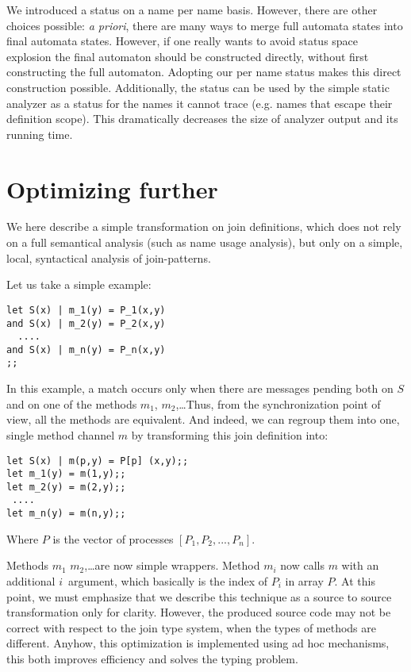 We introduced a  status on a name per name basis.  However,
there are other choices possible: {\em a priori}, there are many ways
to merge full automata states into final automata states. However, if
one really wants to avoid status space explosion the final automaton
should be constructed directly, without first constructing the full
automaton.  Adopting our per name  status makes this direct
construction possible. Additionally, the  status can be used
by the simple static analyzer as a status for the names it cannot
trace (e.g. names that escape their definition scope).  This
dramatically decreases the size of analyzer output and its running
time.

\section{Optimizing further}
\label{fusion}

We here describe a simple transformation on
join definitions, which does not rely on a full semantical analysis
(such as name usage analysis),
but only on a simple, local, syntactical analysis of join-patterns.


Let us take a simple example:
\begin{verbatim}
let S(x) | m_1(y) = P_1(x,y)
and S(x) | m_2(y) = P_2(x,y)
  ....
and S(x) | m_n(y) = P_n(x,y)
;;
\end{verbatim}

In this example, a match occurs only when there are messages pending
both on $S$ and on one of the methods $m_1$, $m_2$,\ldots Thus, from the
synchronization
point of view, all the methods are equivalent. And indeed, we can
regroup them into one, single method channel $m$ by
transforming this join definition into:

\begin{verbatim}
let S(x) | m(p,y) = P[p] (x,y);;
let m_1(y) = m(1,y);;
let m_2(y) = m(2,y);;
 ....
let m_n(y) = m(n,y);;
\end{verbatim}
Where $P$ is the vector of processes $[P_1,P_2,...,P_n]$.

Methods $m_1$ $m_2$,\ldots are now simple wrappers.  Method $m_i$ now
calls $m$ with an additional $i$~argument, which basically is the
index of $P_i$ in array $P$.  At this point, we must emphasize that we
describe this technique as a source to source transformation only for
clarity. However, the produced source code may not be correct with
respect to the join type system, when the types of methods are
different.  Anyhow, this optimization is implemented using ad hoc
mechanisms, this both improves efficiency and solves the typing
problem.


